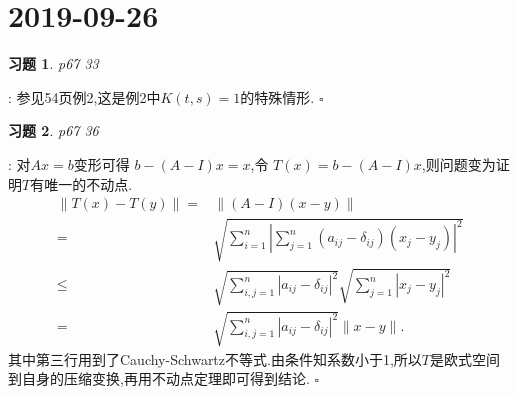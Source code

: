 \documentclass[a4paper]{article}
\newtheorem*{exe}{习题}
\newenvironment{sol}{{\noindent\bfseries 解}:}{\hfill $\square$\par}
\begin{document}
\section{2019-09-26}
\begin{exe}
  p67 33
\end{exe}
\begin{sol}
  参见54页例2,这是例2中$K(t,s)=1$的特殊情形.
\end{sol}
\begin{exe}
  p67 36
\end{exe}
\begin{sol}
  对$Ax=b$变形可得 $b-(A-I)x=x$,令 $T(x)=b-(A-I)x$,则问题变为证明$T$有唯一的不动点.
  \begin{align*}
    \|T(x)-T(y)\|=&\|(A-I)(x-y)\|\\
    =& \sqrt{ \sum_{i=1}^{n} \left| \sum_{j=1}^{n}\left( a_{ij}-\delta_{ij} \right) (x_j-y_j) \right|^{2}}\\
    \le & \sqrt{ \sum_{i,j=1}^{n} \left| a_{ij}-\delta_{ij} \right| ^{2}}\sqrt{\sum_{j=1}^{n}\left| x_j-y_j \right|^2 }\\ 
    = & \sqrt{ \sum_{i,j=1}^{n} \left| a_{ij}-\delta_{ij} \right| ^{2}}\|x-y\|
  .\end{align*}
其中第三行用到了Cauchy-Schwartz不等式.由条件知系数小于1,所以$T$是欧式空间到自身的压缩变换,再用不动点定理即可得到结论.
\end{sol}
\end{document}
